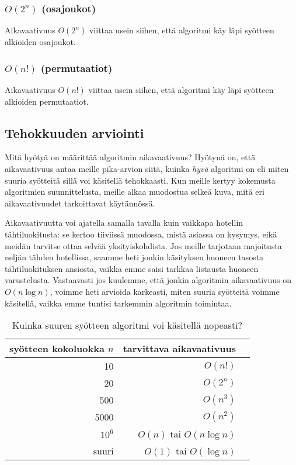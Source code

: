 \subsubsection{$O(2^n)$ (osajoukot)}

Aikavaativuus $O(2^n)$ viittaa usein siihen,
että algoritmi käy läpi syötteen alkioiden osajoukot.

\subsubsection{$O(n!)$ (permutaatiot)}

Aikavaativuus $O(n!)$ viittaa usein siihen,
että algoritmi käy läpi syötteen alkioiden permutaatiot.

\subsection{Tehokkuuden arviointi}

Mitä hyötyä on määrittää algoritmin aikavaativuus?
Hyötynä on, että aikavaativuus antaa meille pika-arvion siitä,
kuinka \emph{hyvä} algoritmi on eli miten suuria syötteitä
sillä voi käsitellä tehokkaasti.
Kun meille kertyy kokemusta algoritmien suunnittelusta,
meille alkaa muodostua selkeä kuva,
mitä eri aikavaativuudet tarkoittavat käytännössä.

Aikavaativuutta voi ajatella samalla tavalla kuin vaikkapa
hotellin tähti\-luokitusta: se kertoo tiiviissä muodossa,
mistä asiassa on kysymys, eikä mei\-dän tarvitse ottaa selvää yksityiskohdista.
Jos meille tarjotaan majoitusta neljän tähden hotellissa,
saamme heti jonkin käsityksen huoneen tasosta
tähtiluokituksen ansiosta,
vaikka emme saisi tarkkaa listausta huoneen varustelusta.
Vastaavasti jos kuulemme, että jonkin algoritmin aikavaativuus on $O(n \log n)$,
voimme heti arvioida karkeasti, miten suuria syötteitä voimme käsitellä,
vaikka emme tuntisi tarkemmin algoritmin toimintaa.

\begin{table}
\center
\begin{tabular}{rrr}
syötteen kokoluokka $n$ & tarvittava aikavaativuus \\
\hline
10 & $O(n!)$ \\
20 & $O(2^n)$ \\
500 & $O(n^3)$ \\
5000 & $O(n^2)$ \\
$10^6$ & $O(n)$ tai $O(n \log n)$ \\
suuri & $O(1)$ tai $O(\log n)$ \\
\end{tabular}
\caption{Kuinka suuren syötteen algoritmi voi käsitellä nopeasti?}
\label{tab:algteh}
\end{table}

